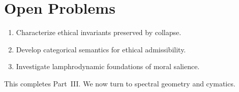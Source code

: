 \section{Open Problems}

\begin{enumerate}
\item Characterize ethical invariants preserved by collapse.
\item Develop categorical semantics for ethical admissibility.
\item Investigate lamphrodynamic foundations of moral salience.
\end{enumerate}

\medskip
\noindent
This completes Part~III. We now turn to spectral geometry and cymatics.
\newpage

